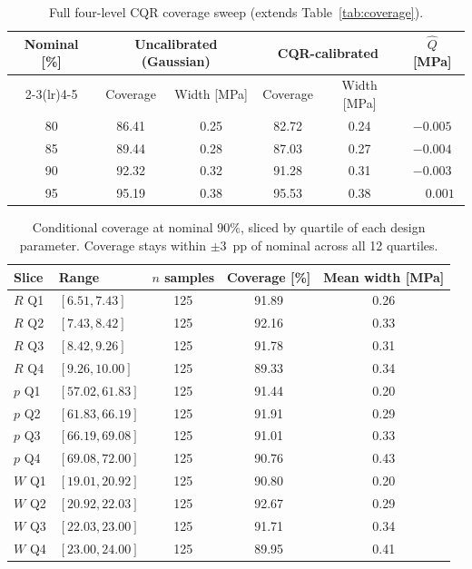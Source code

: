 \documentclass{article}
\begin{document}
\begin{table}[h]
  \centering
  \caption{Full four-level CQR coverage sweep (extends
    Table~\ref{tab:coverage}).}
  \label{tab:coverage-full}
  \begin{tabular}{cccccc}
    \toprule
    Nominal [\%] &
    \multicolumn{2}{c}{Uncalibrated (Gaussian)} &
    \multicolumn{2}{c}{CQR-calibrated} &
    $\hat{Q}$ [MPa] \\
    \cmidrule(lr){2-3}\cmidrule(lr){4-5}
    & Coverage & Width [MPa] & Coverage & Width [MPa] & \\
    \midrule
    80 & 86.41 & 0.25 & 82.72 & 0.24 & $-0.005$ \\
    85 & 89.44 & 0.28 & 87.03 & 0.27 & $-0.004$ \\
    90 & 92.32 & 0.32 & 91.28 & 0.31 & $-0.003$ \\
    95 & 95.19 & 0.38 & 95.53 & 0.38 & $\phantom{-}0.001$ \\
    \bottomrule
  \end{tabular}
\end{table}

\begin{table}[h]
  \centering
  \caption{Conditional coverage at nominal $90\%$, sliced by quartile of
    each design parameter. Coverage stays within $\pm 3$~pp of nominal
    across all 12 quartiles.}
  \label{tab:phase2-conditional}
  \begin{tabular}{llccc}
    \toprule
    Slice & Range & $n$ samples & Coverage [\%] & Mean width [MPa] \\
    \midrule
    $R$ Q1 & $[6.51, 7.43]$  & 125 & 91.89 & 0.26 \\
    $R$ Q2 & $[7.43, 8.42]$  & 125 & 92.16 & 0.33 \\
    $R$ Q3 & $[8.42, 9.26]$  & 125 & 91.78 & 0.31 \\
    $R$ Q4 & $[9.26, 10.00]$ & 125 & 89.33 & 0.34 \\
    $p$ Q1 & $[57.02, 61.83]$ & 125 & 91.44 & 0.20 \\
    $p$ Q2 & $[61.83, 66.19]$ & 125 & 91.91 & 0.29 \\
    $p$ Q3 & $[66.19, 69.08]$ & 125 & 91.01 & 0.33 \\
    $p$ Q4 & $[69.08, 72.00]$ & 125 & 90.76 & 0.43 \\
    $W$ Q1 & $[19.01, 20.92]$ & 125 & 90.80 & 0.20 \\
    $W$ Q2 & $[20.92, 22.03]$ & 125 & 92.67 & 0.29 \\
    $W$ Q3 & $[22.03, 23.00]$ & 125 & 91.71 & 0.34 \\
    $W$ Q4 & $[23.00, 24.00]$ & 125 & 89.95 & 0.41 \\
    \bottomrule
  \end{tabular}
\end{table}
\end{document}
